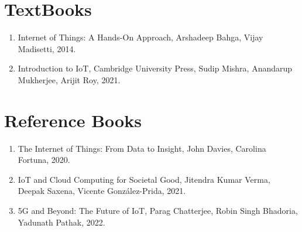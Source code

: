 
\section{TextBooks}
\begin{enumerate}
    \item Internet of Things: A Hands-On Approach, Arshadeep Bahga, Vijay Madisetti, 2014.
    \item Introduction to IoT, Cambridge University Press, Sudip Mishra, Anandarup Mukherjee, Arijit Roy, 2021.
\end{enumerate}

\section{Reference Books}
\begin{enumerate}
    \item The Internet of Things: From Data to Insight, John Davies, Carolina Fortuna, 2020.
    \item IoT and Cloud Computing for Societal Good, Jitendra Kumar Verma, Deepak Saxena, Vicente González-Prida, 2021.
    \item 5G and Beyond: The Future of IoT, Parag Chatterjee, Robin Singh Bhadoria, Yadunath Pathak, 2022.
\end{enumerate}